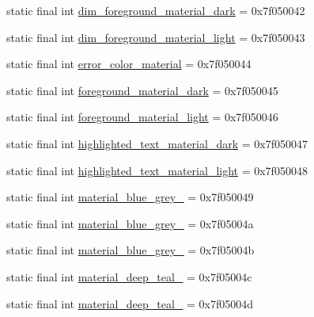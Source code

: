 \begin{DoxyCompactItemize}
\item 
static final int \mbox{\hyperlink{classcom_1_1synnapps_1_1carouselview_1_1_r_1_1color_a592d99bf13e7746e8d48ad67fca37d41}{dim\+\_\+foreground\+\_\+material\+\_\+dark}} = 0x7f050042
\item 
static final int \mbox{\hyperlink{classcom_1_1synnapps_1_1carouselview_1_1_r_1_1color_a8e9c1c15fe1b354e8808360e0bb74cc0}{dim\+\_\+foreground\+\_\+material\+\_\+light}} = 0x7f050043
\item 
static final int \mbox{\hyperlink{classcom_1_1synnapps_1_1carouselview_1_1_r_1_1color_a9d37f0f58ac7a1b3c2b90f879af76359}{error\+\_\+color\+\_\+material}} = 0x7f050044
\item 
static final int \mbox{\hyperlink{classcom_1_1synnapps_1_1carouselview_1_1_r_1_1color_a3f81fa9184d290a4fafbab7fed4d006f}{foreground\+\_\+material\+\_\+dark}} = 0x7f050045
\item 
static final int \mbox{\hyperlink{classcom_1_1synnapps_1_1carouselview_1_1_r_1_1color_a0046423b4ab18ef537772fa96df74159}{foreground\+\_\+material\+\_\+light}} = 0x7f050046
\item 
static final int \mbox{\hyperlink{classcom_1_1synnapps_1_1carouselview_1_1_r_1_1color_a04a4f3353af6a6b836e4ba91871ba2a1}{highlighted\+\_\+text\+\_\+material\+\_\+dark}} = 0x7f050047
\item 
static final int \mbox{\hyperlink{classcom_1_1synnapps_1_1carouselview_1_1_r_1_1color_a101a7caa50c3f3bac653fc11a193099a}{highlighted\+\_\+text\+\_\+material\+\_\+light}} = 0x7f050048
\item 
static final int \mbox{\hyperlink{classcom_1_1synnapps_1_1carouselview_1_1_r_1_1color_afe8c3fadad620ce8053a87d779895e3a}{material\+\_\+blue\+\_\+grey\+\_}} = 0x7f050049
\item 
static final int \mbox{\hyperlink{classcom_1_1synnapps_1_1carouselview_1_1_r_1_1color_af8643f36f10ad1247c7dd6855b2afa91}{material\+\_\+blue\+\_\+grey\+\_}} = 0x7f05004a
\item 
static final int \mbox{\hyperlink{classcom_1_1synnapps_1_1carouselview_1_1_r_1_1color_a8f4fba37924cb98314753a441649e8d6}{material\+\_\+blue\+\_\+grey\+\_}} = 0x7f05004b
\item 
static final int \mbox{\hyperlink{classcom_1_1synnapps_1_1carouselview_1_1_r_1_1color_ae2588681576a8dd85dd003091cf76c3a}{material\+\_\+deep\+\_\+teal\+\_}} = 0x7f05004c
\item 
static final int \mbox{\hyperlink{classcom_1_1synnapps_1_1carouselview_1_1_r_1_1color_a5bbf3c7c02c24e264aa75cf3f28bbdda}{material\+\_\+deep\+\_\+teal\+\_}} = 0x7f05004d

\end{DoxyCompactItemize}
